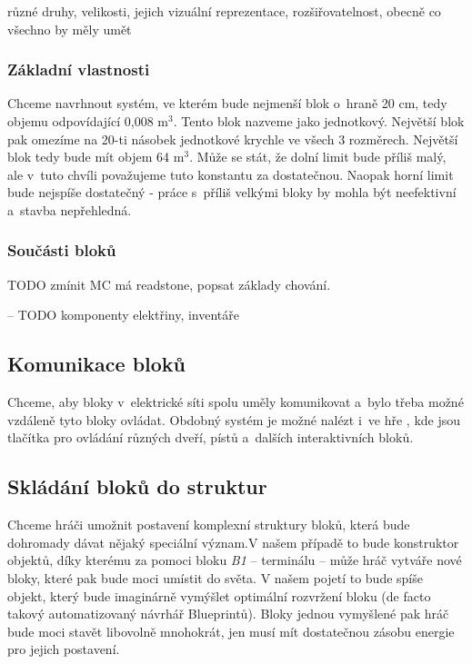 různé druhy, velikosti, jejich vizuální reprezentace, rozšiřovatelnost, obecně co všechno by měly umět

\subsubsection{Základní vlastnosti}
Chceme navrhnout systém, ve kterém bude nejmenší blok o~hraně 20 cm, tedy objemu odpovídající 0,008 m$^3$. Tento blok nazveme jako jednotkový. Největší blok pak omezíme na 20-ti násobek jednotkové krychle ve všech 3 rozměrech. Největší blok tedy bude mít objem 64 m$^3$. Může se stát, že dolní limit bude příliš malý, ale v~tuto chvíli považujeme tuto konstantu za dostatečnou. Naopak horní limit bude nejspíše dostatečný - práce s~příliš velkými bloky by mohla být neefektivní a~stavba nepřehledná.

\subsubsection{Součásti bloků}
TODO zmínit MC má readstone, popsat základy chování.



-- TODO komponenty elektřiny, inventáře

\subsection{Komunikace bloků}

Chceme, aby bloky v~elektrické síti spolu uměly komunikovat a~bylo třeba možné vzdáleně tyto bloky ovládat. Obdobný systém je možné nalézt i~ve hře \SE{}, kde jsou tlačítka pro ovládání různých dveří, pístů a~dalších interaktivních bloků.

\subsection{Skládání bloků do struktur}
Chceme hráči umožnit postavení komplexní struktury bloků, která bude dohromady dávat nějaký speciální význam.V našem případě to bude konstruktor objektů, díky kterému za pomoci bloku \textit{B1} -- terminálu -- může hráč vytváře nové bloky, které pak bude moci umístit do světa. V našem pojetí to bude spíše objekt, který bude imaginárně vymýšlet optimální rozvržení bloku (de facto takový automatizovaný návrhář Blueprintů). Bloky jednou vymyšlené pak hráč bude moci stavět libovolně mnohokrát, jen musí mít dostatečnou zásobu energie pro jejich postavení.

